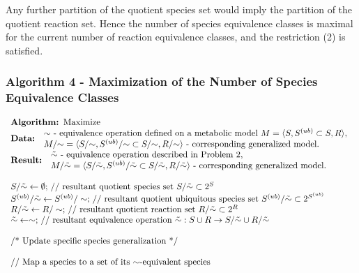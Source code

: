 \documentclass[9pt]{article}
\newcounter{def}
\begin{document}
Any further partition of the quotient species set would imply the partition of the quotient reaction set. Hence the number of species equivalence classes is maximal for the current number of reaction equivalence classes, and the restriction (2) is satisfied.

\subsubsection*{Algorithm 4 - Maximization of the Number of Species Equivalence Classes}
\[ \begin{array}{l}
\mbox{\textbf{Algorithm: }Maximize}\\
\mbox{\textbf{Data: }} \begin{array}{l} \mbox{${\sim}$ - equivalence operation defined on a metabolic model $M=\langle S, S^{(ub)}\subset{S}, R \rangle$,}\\ \mbox{$M/{\sim} = \langle S/{\sim}, S^{(ub)}/{\sim} \subset S/{\sim}, R/{\sim} \rangle$ - corresponding generalized model.} 
\end{array}\\
\mbox{\textbf{Result: }} \begin{array}{l} \mbox{$\tilde{\sim}$ - equivalence operation described in Problem~2,}\\  \mbox{$M/\tilde{\sim} = \langle S/\tilde{\sim}, S^{(ub)}/\tilde{\sim} \subset S/\tilde{\sim}, R/\tilde{\sim} \rangle$ - corresponding generalized model.} \end{array}\\
\mbox{~}\\
\mbox{$S/\tilde{\sim} \leftarrow \emptyset;$ // resultant quotient species set $ S/{\tilde{\sim}}\subset 2^S$}\\
\mbox{$S^{(ub)}/\tilde{\sim} \leftarrow S^{(ub)}/\sim;$ // resultant quotient ubiquitous species set $ S^{(ub)}/{\tilde{\sim}}\subset 2^{S^{(ub)}}$}\\
\mbox{$R/\tilde{\sim} \leftarrow R/\sim;$ // resultant quotient reaction set $ R/{\tilde{\sim}}\subset 2^R$}\\
\mbox{$\tilde{\sim} \leftarrow \sim;$ // resultant equivalence operation $ {\tilde{\sim}}: S\cup{R} \rightarrow S/{\tilde{\sim}}\cup{R/{\tilde{\sim}}}$}\\
\mbox{~}\\
\mbox{/* Update specific species generalization */}\\
\mbox{~}\\
\mbox{// Map a species to a set of its $\sim$-equivalent species}\\

\end{array}\]
\end{document}
